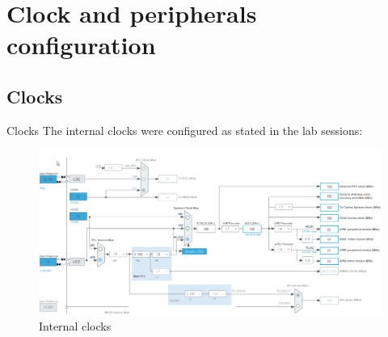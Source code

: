 \documentclass[aspectratio=169]{beamer}
\begin{document}
\section{Clock and peripherals configuration}
\subsection{Clocks}
\begin{frame}{Clocks}
The internal clocks were configured as stated in the lab sessions:
\begin{figure}
    \centering
    \includegraphics[width=0.75\linewidth]{Graphics/clock_conf.png}
    \caption{Internal clocks}
    \label{fig:Internal_clocks}
\end{figure}
\end{frame}
\end{document}
